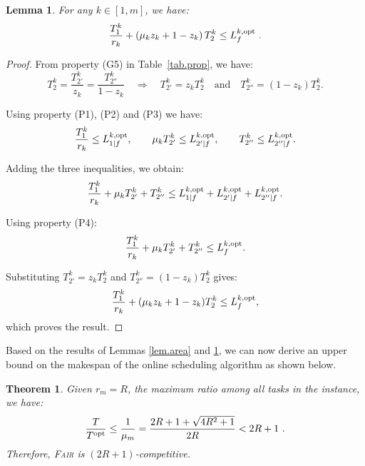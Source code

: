\documentclass{article}
\newtheorem{lemma}{Lemma}
\newtheorem{theorem}{Theorem}
\newcommand\fair{\textsc{Fair}\xspace}
\newcommand\ratio{R\xspace}
\newcommand\rratio{r\xspace}
\newcommand\opt{\textnormal{opt}\xspace}
\begin{document}
\begin{lemma}\label{lem.path}
For any $k \in [1,m]$, we have:
\begin{equation}\label{CP}
\frac{T_1^k}{\rratio_k} + \left(\mu_k z_k + 1 - z_k\right) T_2^k \le L_f^{k,\opt} \ .
\end{equation}
\end{lemma}

\begin{proof}
From property (G5) in Table~\ref{tab.prop}, we have:
\[
T_2^k = \frac{T_{2'}^k}{z_k} = \frac{T_{2''}^k}{1 - z_k}
\quad \Rightarrow \quad
T_{2'}^k = z_k T_2^k \quad \text{and} \quad T_{2''}^k = (1 - z_k) T_2^k.
\]

Using property (P1), (P2) and (P3) we have:
\[
\frac{T_1^k}{\rratio_k} \le L_{1|f}^{k,\opt}, \qquad
\mu_k T_{2'}^k \le L_{2'|f}^{k,\opt}, \qquad 
T_{2''}^k \le L_{2''|f}^{k,\opt}.
\]

Adding the three inequalities, we obtain:
\[
\frac{T_1^k}{\rratio_k} + \mu_k T_{2'}^k + T_{2''}^k \le L_{1|f}^{k,\opt} + L_{2'|f}^{k,\opt} + L_{2''|f}^{k,\opt}.
\]

Using property (P4):
\[
\frac{T_1^k}{\rratio_k} + \mu_k T_{2'}^k + T_{2''}^k \le L_f^{k,\opt}.
\]

Substituting \(T_{2'}^k = z_k T_2^k\) and \(T_{2''}^k = (1 - z_k) T_2^k\) gives:
\[
\frac{T_1^k}{\rratio_k} + (\mu_k z_k + 1 - z_k) T_2^k \le L_f^{k,\opt},
\]
which proves the result.
\end{proof}


Based on the results of Lemmas \ref{lem.area} and \ref{lem.path}, we can now derive an upper bound on the makespan of the online scheduling algorithm as shown below.
\begin{theorem}\label{lem.makespan}
Given $\rratio_m=\ratio$, the maximum ratio among all tasks in the instance, we have:
\begin{equation}\label{eq.makespan}
\frac{T}{T^{\opt}} \leq \frac{1}{\mu_m} = \frac{2\ratio+1+\sqrt{4\ratio^2+1}}{2\ratio}<2\ratio+1 \ .
\end{equation}
Therefore, \fair is $(2\ratio+1)$-competitive.
\end{theorem}
\end{document}
